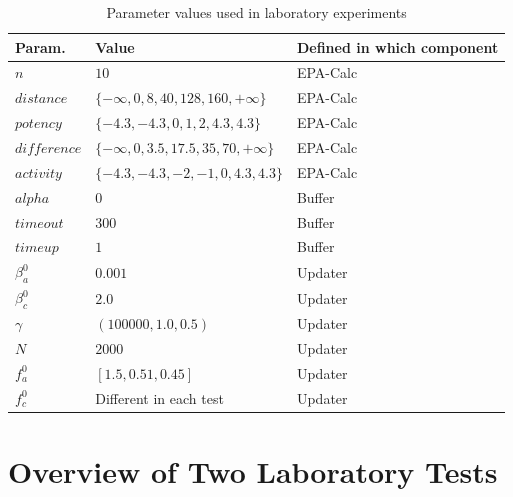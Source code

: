 %
\begin{table}
\centering
\caption{Parameter values used in laboratory experiments}
\label{table:param-setting}
\begin{tabular}{| l | l | l |}
\hline
\textbf{Param.} & \textbf{Value} & \textbf{Defined in which component} \\ \hline
$n$ & $10$ & EPA-Calc \\ \hline
$distance$ & $\{-\infty, 0, 8, 40, 128, 160, +\infty\}$ & EPA-Calc \\ \hline
$potency$ & $\{-4.3, -4.3, 0, 1, 2, 4.3, 4.3\}$ & EPA-Calc \\ \hline 
$difference$ & $\{-\infty, 0, 3.5, 17.5, 35, 70, +\infty\}$ & EPA-Calc \\ \hline
$activity$ & $\{-4.3, -4.3, -2, -1, 0, 4.3, 4.3\}$ & EPA-Calc \\ \hline
$alpha$ & $0$ & Buffer \\ \hline
$timeout$ & $300$ & Buffer \\ \hline
$timeup$ & $1$ & Buffer \\ \hline
$\beta_{a}^{0}$ & $0.001$ & Updater \\ \hline
$\beta_{c}^{0}$ & $2.0$ & Updater \\ \hline
$\gamma$ & $(100000, 1.0, 0.5)$ & Updater \\ \hline
$N$ & $2000$ & Updater \\ \hline
$f_a^{0}$ & $[1.5, 0.51, 0.45]$ & Updater \\ \hline
$f_c^{0}$ & Different in each test &Updater \\ \hline
\end{tabular}
\end{table}

\section{Overview of Two Laboratory Tests}


